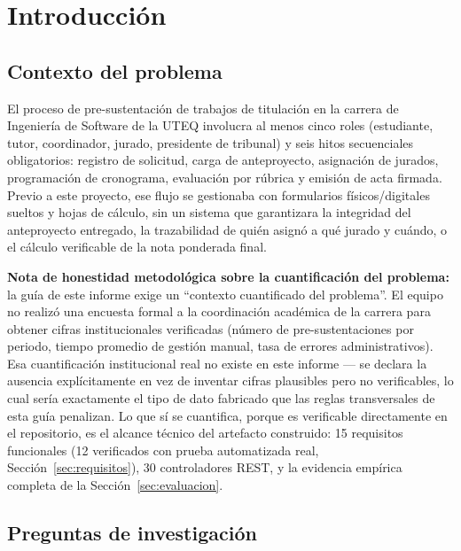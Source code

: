 \section{Introducción}
\label{sec:introduccion}

\subsection{Contexto del problema}

El proceso de pre-sustentación de trabajos de titulación en la carrera de Ingeniería de Software de la
UTEQ involucra al menos cinco roles (estudiante, tutor, coordinador, jurado, presidente de tribunal) y
seis hitos secuenciales obligatorios: registro de solicitud, carga de anteproyecto, asignación de
jurados, programación de cronograma, evaluación por rúbrica y emisión de acta firmada. Previo a este
proyecto, ese flujo se gestionaba con formularios físicos/digitales sueltos y hojas de cálculo, sin un
sistema que garantizara la integridad del anteproyecto entregado, la trazabilidad de quién asignó a qué
jurado y cuándo, o el cálculo verificable de la nota ponderada final.

\textbf{Nota de honestidad metodológica sobre la cuantificación del problema:} la guía de este informe
exige un ``contexto cuantificado del problema''. El equipo no realizó una encuesta formal a la
coordinación académica de la carrera para obtener cifras institucionales verificadas (número de
pre-sustentaciones por periodo, tiempo promedio de gestión manual, tasa de errores administrativos). Esa
cuantificación institucional real no existe en este informe --- se declara la ausencia explícitamente en
vez de inventar cifras plausibles pero no verificables, lo cual sería exactamente el tipo de dato
fabricado que las reglas transversales de esta guía penalizan. Lo que sí se cuantifica, porque es
verificable directamente en el repositorio, es el alcance técnico del artefacto construido: 15
requisitos funcionales (12 verificados con prueba automatizada real, Sección~\ref{sec:requisitos}), 30
controladores REST, y la evidencia empírica completa de la Sección~\ref{sec:evaluacion}.

\subsection{Preguntas de investigación}

